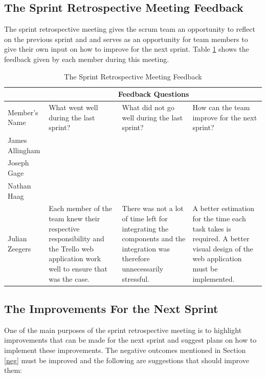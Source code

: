 \documentclass[12pt,onecolumn]{article}
\begin{document}
	\subsection{The Sprint Retrospective Meeting Feedback}
	The sprint retrospective meeting gives the scrum team an opportunity to reflect on the previous sprint and and serves as an opportunity for team members to give their own input on how to improve for the next sprint. Table \ref{feedback} shows the feedback given by each member during this meeting.
	
	\begin{table}[h!]
		\caption{The Sprint Retrospective Meeting Feedback\label{feedback}}
		\small
		\begin{tabular}{|>{\centering\arraybackslash}p{1.8cm}|p{3.4cm}|p{3.4cm}|p{3.4cm}|}
			\hline
			\multicolumn{1}{|c|}{}  &  \multicolumn{3}{c|}{Feedback Questions}  \\
			\hline
			Member's Name & What went well during the last sprint? & What did not go well during the last sprint? & How can the team improve for the next sprint? \\
			\hline
			James Allingham & & & \\
			\hline
			Joseph Gage & & & \\
			\hline
			Nathan Haag & & & \\
			\hline
			Julian Zeegers & Each member of the team knew their respective responsibility and the Trello web application work well to ensure that was the case. & There was not a lot of time left for integrating the components and the integration was therefore unnecessarily stressful.   & A better estimation for the time each task takes is required. A better visual design of the web application must be implemented.\\
			\hline
			
			
		\end{tabular}
	\end{table}
	
	
	\subsection{The Improvements For the Next Sprint}
	One of the main purposes of the sprint retrospective meeting is to highlight improvements that can be made for the next sprint and suggest plans on how to implement these improvements. The negative outcomes mentioned in Section \ref{neg} must be improved and the following are suggestions that should improve them:
	
\end{document}
